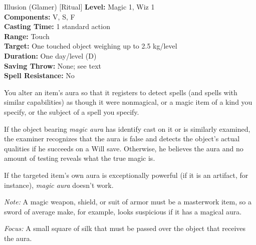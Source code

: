 {Illusion (Glamer) [Ritual]}
{
	\textbf{Level:}
	Magic 1, Wiz 1\\
	\textbf{Components:}
	V, S, F\\
	\textbf{Casting Time:}
	1 standard action\\
	\textbf{Range:}
	Touch\\
	\textbf{Target:}
	One touched object weighing up to 2.5 kg/level\\
	\textbf{Duration:}
	One day/level (D)\\
	\textbf{Saving Throw:}
	None; see text\\
	\textbf{Spell Resistance:}
	No\\
}
{
	You alter an item's aura so that it registers to detect spells (and spells with similar capabilities) as though it were nonmagical, or a magic item of a kind you specify, or the subject of a spell you specify.

	If the object bearing \emph{magic aura} has identify cast on it or is similarly examined, the examiner recognizes that the aura is false and detects the object's actual qualities if he succeeds on a Will save. Otherwise, he believes the aura and no amount of testing reveals what the true magic is.

	If the targeted item's own aura is exceptionally powerful (if it is an artifact, for instance), \emph{magic aura} doesn't work.

	\textit{Note:} A magic weapon, shield, or suit of armor must be a masterwork item, so a sword of average make, for example, looks suspicious if it has a magical aura.

	\textit{Focus:}
	A small square of silk that must be passed over the object that receives the aura.

}
